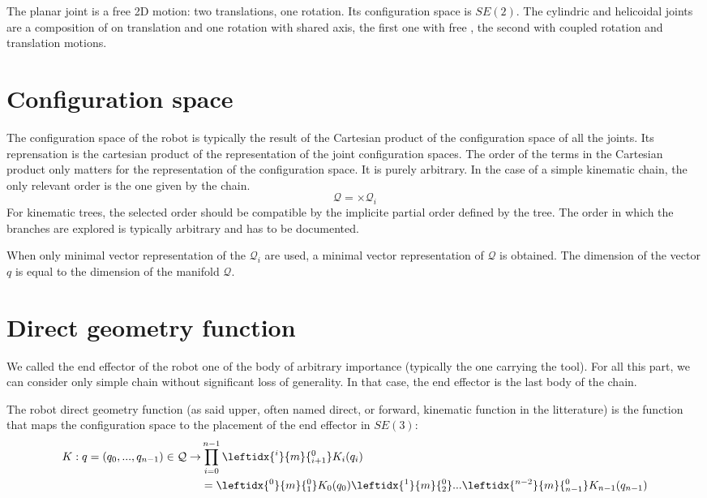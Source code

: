 \documentclass{book}
\begin{document}
The planar joint is a free 2D motion: two translations, one rotation. Its configuration space is $SE(2)$. The cylindric and helicoidal joints are a composition of on translation and one rotation with shared axis, the first one with free , the second with coupled rotation and translation motions.

\section{Configuration space}

The configuration space of the robot is typically the result of the Cartesian product of the configuration space of all the joints. Its reprensation is the cartesian product of the representation of the joint configuration spaces. The order of the terms in the Cartesian product only matters for the representation of the configuration space. It is purely arbitrary.
In the case of a simple kinematic chain, the only relevant order is the one given by the chain.
\[ \mathcal{Q} = \times \mathcal{Q}_i \]
For kinematic trees, the selected order should be compatible by the implicite partial order defined by the tree. The order in which the branches are explored is typically arbitrary and has to be documented.

When only minimal vector representation of the $\mathcal{Q}_i$ are used, a minimal vector representation of $\mathcal{Q}$ is obtained. The dimension of the vector $q$ is equal to the dimension of the manifold $\mathcal{Q}$.

\section{Direct geometry function}

We called the end effector of the robot one of the body of arbitrary importance (typically the one carrying the tool). 
For all this part, we can consider only simple chain without significant loss of generality. In that case, the end effector is the last body of the chain.

The robot direct geometry function (as said upper, often named direct, or forward, kinematic function in the litterature) is the function that maps the configuration space to the placement of the end effector in $SE(3)$:
\begin{align*}
 K: q = (q_0, ... , q_{n-1}) \in \mathcal{Q}  \rightarrow & \prod_{i=0}^{n-1} \leftidx{^i}{m}{_{i+1}^0} K_i(q_i) \\
&=  \leftidx{^0}{m}{_{1}^0} K_0(q_0) \leftidx{^1}{m}{_{2}^0} ...   \leftidx{^{n-2}}{m}{_{n-1}^0} K_{n-1}(q_{n-1})
\end{align*}
\end{document}
